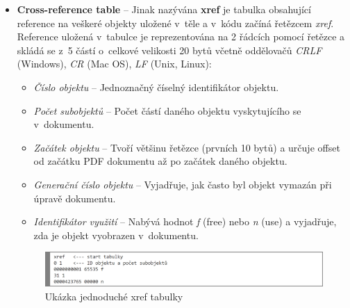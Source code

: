 \begin{itemize}
	\item \textbf{Cross-reference table} -- Jinak nazývána \textbf{xref} je tabulka obsahující reference na veškeré objekty uložené v~těle a v~kódu začíná řetězcem \textit{xref}. Reference uložená v~tabulce je reprezentována na 2 řádcích pomocí řetězce a skládá se z~5 částí o~celkové velikosti 20 bytů včetně oddělovačů \textit{CRLF} (Windows), \textit{CR} (Mac OS), \textit{LF} (Unix, Linux):
	\begin{itemize}
		\item \textit{Číslo objektu} -- Jednoznačný číselný identifikátor objektu.
		\item \textit{Počet subobjektů} -- Počet částí daného objektu vyskytujícího se v~dokumentu.
		\item \textit{Začátek objektu} -- Tvoří většinu řetězce (prvních 10 bytů) a určuje offset od začátku PDF dokumentu až po začátek daného objektu.
		\item \textit{Generační číslo objektu} -- Vyjadřuje, jak často byl objekt vymazán při úpravě dokumentu. 
		\item \textit{Identifikátor využití} -- Nabývá hodnot \textit{f} (free) nebo \textit{n} (use) a vyjadřuje, zda je objekt vyobrazen v~dokumentu.
	\end{itemize}
	\begin{figure}[h!]
	\centering
	\includegraphics[width=15cm]{img/pdf_xref}
	\caption{Ukázka jednoduché xref tabulky}
	\label{fig:pdf_xref}
	\end{figure}


\end{itemize}
